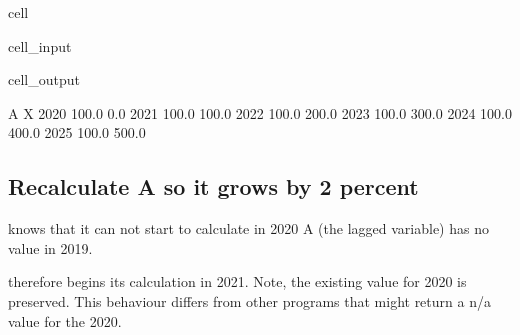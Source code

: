 \documentclass[letterpaper,10pt,english]{jupyterBook}
\begin{document}
\begin{sphinxuseclass}{cell}\begin{sphinxVerbatimInput}

\begin{sphinxuseclass}{cell_input}
\begin{sphinxVerbatim}[commandchars=\\\{\}]
 
\end{sphinxVerbatim}

\end{sphinxuseclass}\end{sphinxVerbatimInput}
\begin{sphinxVerbatimOutput}

\begin{sphinxuseclass}{cell_output}
\begin{sphinxVerbatim}[commandchars=\\\{\}]
          A      X
2020  100.0    0.0
2021  100.0  100.0
2022  100.0  200.0
2023  100.0  300.0
2024  100.0  400.0
2025  100.0  500.0
\end{sphinxVerbatim}

\end{sphinxuseclass}\end{sphinxVerbatimOutput}

\end{sphinxuseclass}

\subsection{Recalculate A so  it grows by 2 percent}
\label{\detokenize{content/04_PythonEssentials/mfcalc:recalculate-a-so-it-grows-by-2-percent}}
\sphinxAtStartPar
{}knows that it can not start to calculate in 2020 A (the lagged variable) has no value in 2019.

\sphinxAtStartPar
{} therefore begins its calculation in 2021. Note, the existing value for 2020 is preserved.  This behaviour differs from other programs that might return a n/a value for the 2020.
\end{document}
